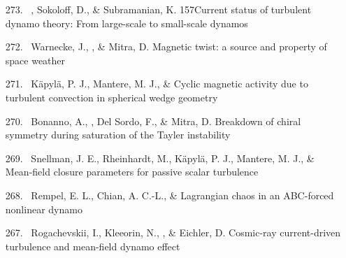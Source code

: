 \begin{itemize}
\item[{273.}~]
\Brandenburg, Sokoloff, D., \& Subramanian, K.
{157}{Current status of turbulent dynamo theory: From large-scale to small-scale dynamos}

\item[{272.}~]
Warnecke, J., \Brandenburg, \& Mitra, D.
{Magnetic twist: a source and property of space weather}

\item[{271.}~]
K\"apyl\"a, P. J., Mantere, M. J., \& \Brandenburg{}
{Cyclic magnetic activity due to turbulent convection in spherical wedge geometry}

\item[{270.}~]
Bonanno, A., \Brandenburg, Del Sordo, F., \& Mitra, D.
{Breakdown of chiral symmetry during saturation of the Tayler instability}

\item[{269.}~]
Snellman, J. E., Rheinhardt, M., K\"apyl\"a, P. J., Mantere, M. J., \& \Brandenburg{}
{Mean-field closure parameters for passive scalar turbulence}

\item[{268.}~]
Rempel, E. L., Chian, A. C.-L., \& \Brandenburg{}
{Lagrangian chaos in an ABC-forced nonlinear dynamo}

\item[{267.}~]
Rogachevskii, I., Kleeorin, N., \Brandenburg, \& Eichler, D.
{Cosmic-ray current-driven turbulence and mean-field dynamo effect}


\end{itemize}
